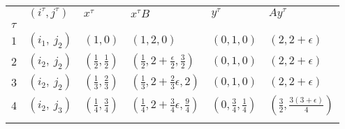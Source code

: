 \begin{tabular}{llllll}
    \toprule
    {} &       $(i^\tau, j^\tau)$ &             $x^\tau$ &               $x^{\tau}B$ &                $y^\tau$ &                 $Ay^\tau$ \\
    $\tau$ &                &                         &                           &                         &                           \\
    \midrule
    $1$         &  $(i_1,\ j_2)$ &  $(1, 0)$ &  $(1, 2, 0 )$ &  $(0, 1, 0)$ &  $(2, 2 + \epsilon)$ \\
    $2$         &  $(i_2,\ j_2)$ &  $(\frac{1}{2}, \frac{1}{2})$ &  $(\frac{1}{2}, 2 + \frac{\epsilon}{2}, \frac{3}{2})$ &  $(0, 1, 0)$ &  $(2, 2 + \epsilon)$ \\
    $3$         &  $(i_2,\ j_2)$ &  $(\frac{1}{3}, \frac{2}{3})$ &  $(\frac{1}{3}, 2 + \frac{2}{3}\epsilon, 2)$ &  $(0, 1, 0)$ &  $(2, 2 + \epsilon)$ \\
    $4$         &  $(i_2,\ j_3)$ &  $(\frac{1}{4}, \frac{3}{4})$ &  $(\frac{1}{4}, 2 + \frac{3}{4}\epsilon, \frac{9}{4})$ &  $(0, \frac{3}{4}, \frac{1}{4})$ &  $(\frac{3}{2}, \frac{3(3+\epsilon)}{4})$\\
    \bottomrule
    \\
    \end{tabular}